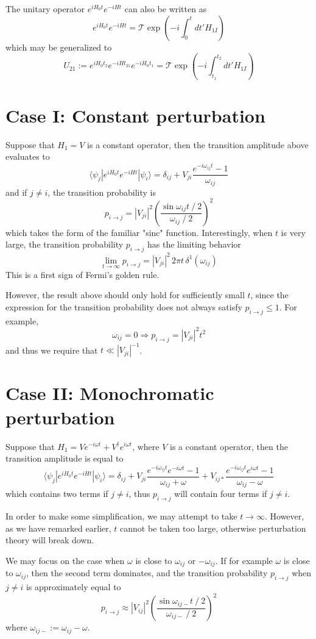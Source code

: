 \documentclass[12pt, oneside]{book}
\begin{document}
The unitary operator $e^{iH_0t}e^{-iHt}$ can also be written as
\[
e^{iH_0t}e^{-iHt}=\mathcal{T}\exp\left(-i\int_0^tdt'H_{1I}\right)
\]
which may be generalized to
\[
U_{21}:=e^{iH_0t_2}e^{-iHt_{21}}e^{-iH_0t_1}=\mathcal{T}\exp\left(-i\int_{t_1}^{t_2}dt'H_{1I}\right)
\]

\section*{Case I: Constant perturbation}
Suppose that $H_1=V$ is a constant operator, then the transition amplitude above evaluates to
\[
\langle\psi_j|e^{iH_0t}e^{-iHt}|\psi_i\rangle=\delta_{ij}+V_{ji}\frac{e^{-i\omega_{ij}t}-1}{\omega_{ij}}
\]
and if $j\ne i$, the transition probability is
\[
p_{i\to j}=|V_{ji}|^2\left(\frac{\sin{\omega_{ij}t\mathbin/2}}{\omega_{ij}\mathbin/2}\right)^2
\]
which takes the form of the familiar "sinc" function. Interestingly, when $t$ is very large, the transition probability $p_{i\to j}$ has the limiting behavior
\[
\lim_{t\to\infty}p_{i\to j}=|V_{ji}|^2\,2\pi t\,\delta^1(\omega_{ij})
\]
This is a first sign of Fermi's golden rule.

However, the result above should only hold for sufficiently small $t$, since the expression for the transition probability does not always satisfy $p_{i\to j}\le1$. For example,
\[
\omega_{ij}=0\Rightarrow
p_{i\to j}=|V_{ji}|^2t^2
\]
and thus we require that $t\ll|V_{ji}|^{-1}$.

\section*{Case II: Monochromatic perturbation}
Suppose that $H_1=Ve^{-i\omega t}+V^{\dagger}e^{i\omega t}$, where $V$ is a constant operator, then the transition amplitude is equal to
\[
\langle\psi_j|e^{iH_0t}e^{-iHt}|\psi_i\rangle=\delta_{ij}+V_{ji}\frac{e^{-i\omega_{ij}t}e^{-i\omega t}-1}{\omega_{ij}+\omega}+V_{ij*}\frac{e^{-i\omega_{ij}t}e^{i\omega t}-1}{\omega_{ij}-\omega}
\]
which contains two terms if $j\ne i$, thus $p_{i\to j}$ will contain four terms if $j\ne i$.

In order to make some simplification, we may attempt to take $t\to\infty$. However, as we have remarked earlier, $t$ cannot be taken too large, otherwise perturbation theory will break down.

We may focus on the case when $\omega$ is close to $\omega_{ij}$ or $-\omega_{ij}$. If for example $\omega$ is close to $\omega_{ij}$, then the second term dominates, and the transition probability $p_{i\to j}$ when $j\ne i$ is approximately equal to
\[
p_{i\to j}\approx|V_{ij}|^2\left(\frac{\sin{\omega_{ij-}t\mathbin/2}}{\omega_{ij-}\mathbin/2}\right)^2
\]
where $\omega_{ij-}:=\omega_{ij}-\omega$.
\end{document}
